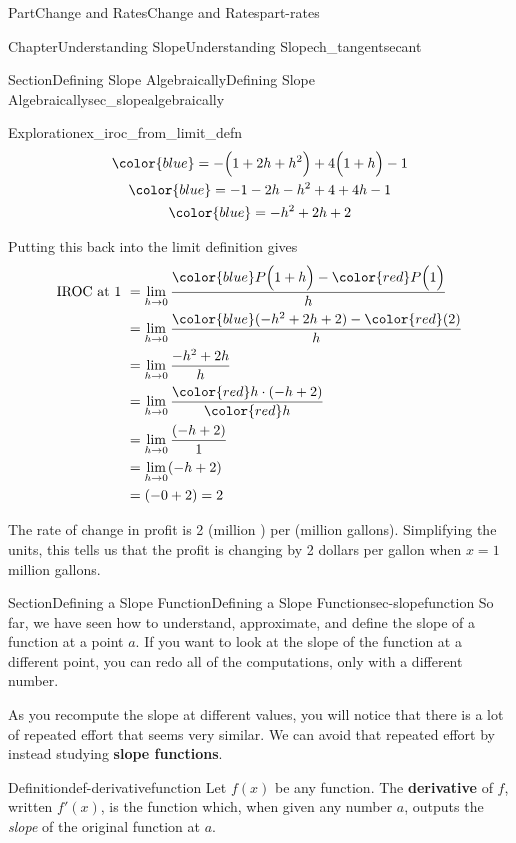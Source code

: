 \documentclass{tufte-book}
\newcommand{\terminology}[1]{\textbf{#1}}
\numberwithin{equation}{chapter}
\newcommand{\amp}{&}
\begin{document}
\begin{partptx}{Part}{Change and Rates}{}{Change and Rates}{}{}{part-rates}
\begin{chapterptx}{Chapter}{Understanding Slope}{}{Understanding Slope}{}{}{ch_tangentsecant}
\begin{sectionptx}{Section}{Defining Slope Algebraically}{}{Defining Slope Algebraically}{}{}{sec_slopealgebraically}
\begin{exploration}{Exploration}{}{ex_iroc_from_limit_defn}
\begin{gather*}
\color{blue} = -\Big(1 + 2h + h^2\Big) + 4\Big(1 + h\Big) - 1\\
\color{blue} = -1 - 2h - h^2 + 4 + 4h - 1\\
\color{blue} = - h^2  + 2h +2 
\end{gather*}
%
\par
Putting this back into the limit definition gives%
\begin{align*}
\text{IROC at 1 } \amp = \lim_{h\rightarrow 0} \dfrac{  {\color{blue}P\Big(1+h\Big)} - {\color{red} P\Big(1\Big)}  }{h}\\
\amp = \lim_{h\rightarrow 0} \dfrac{ {\color{blue} ( - h^2  + 2h +2 )} - {\color{red} (2) }  }{h}\\
\amp = \lim_{h\rightarrow 0} \dfrac{ - h^2  + 2h }{h}\\
\amp = \lim_{h\rightarrow 0} \dfrac{ {\color{red} h}\cdot(-h  + 2) }{\color{red} h}\\
\amp = \lim_{h\rightarrow 0} \dfrac{ (-h  + 2) }{1}\\
\amp = \lim_{h\rightarrow 0} (-h  + 2) \\
\amp =  (-0  + 2) = 2 
\end{align*}
%
\par
The rate of change in profit is 2 (million \textdollar{}) per (million gallons).  Simplifying the units, this tells us that the profit is changing by 2 dollars per gallon when \(x=1\) million gallons.%
\end{exploration}%
\end{sectionptx}
%
%
\typeout{************************************************}
\typeout{************************************************}
%
\begin{sectionptx}{Section}{Defining a Slope Function}{}{Defining a Slope Function}{}{}{sec-slopefunction}
So far, we have seen how to understand, approximate, and define the slope of a function at a point \(a\). If you want to look at the slope of the function at a different point, you can redo all of the computations, only with a different number.%
\par
As you recompute the slope at different values, you will notice that there is a lot of repeated effort that seems very similar.  We can avoid that repeated effort by instead studying \terminology{slope functions}.%
\begin{definition}{Definition}{}{def-derivativefunction}%
Let \(f(x)\) be any function. The \terminology{derivative} of \(f\), written \(f'(x)\), is the function which, when given any number \(a\), outputs the \emph{slope} of the original function at \(a\).%

\end{definition}
\end{sectionptx}
\end{chapterptx}
\end{partptx}
\end{document}
